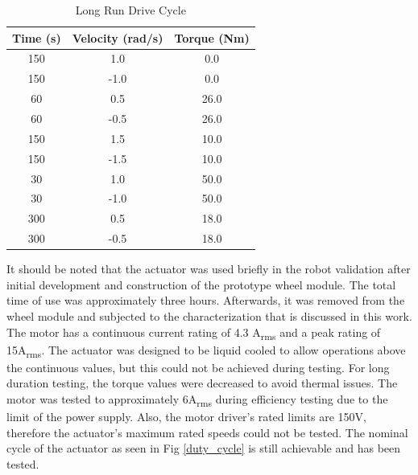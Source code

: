 \begin{table}[h]
  \vskip0.2cm
  \caption{Long Run Drive Cycle}
  \label{table_2}
  \begin{center}
    \vskip-0.2cm
    \begin{tabular}{|c||c||c|}
    \hline
    Time (s) & Velocity (rad/s) & Torque (Nm)\\
    \hline
    150 & 1.0 & 0.0\\
    \hline
    150 & -1.0 & 0.0\\
    \hline
    60 & 0.5 & 26.0\\
    \hline
    60 & -0.5 & 26.0\\
    \hline
    150 & 1.5 & 10.0\\
    \hline
    150 & -1.5 & 10.0\\
    \hline
    30 & 1.0 & 50.0\\
    \hline
    30 & -1.0 & 50.0\\
    \hline
    300 & 0.5 & 18.0\\
    \hline
    300 & -0.5 & 18.0\\
    \hline
    \end{tabular}
  \end{center}
\end{table}

It should be noted that the actuator was used briefly in the robot validation after initial development and construction of the prototype wheel module.
The total time of use was approximately three hours.
Afterwards, it was removed from the wheel module and subjected to the characterization that is discussed in this work.
The motor has a continuous current rating of 4.3 A\textsubscript{rms} and a peak rating of 15A\textsubscript{rms}.
The actuator was designed to be liquid cooled to allow operations above the continuous values, but this could not be achieved during testing.
For long duration testing, the torque values were decreased to avoid thermal issues.
The motor was tested to approximately 6A\textsubscript{rms} during efficiency testing due to the limit of the power supply.
Also, the motor driver's rated limits are 150V, therefore the actuator's maximum rated speeds could not be tested.
The nominal cycle of the actuator as seen in Fig \ref{duty_cycle} is still achievable and has been tested.

